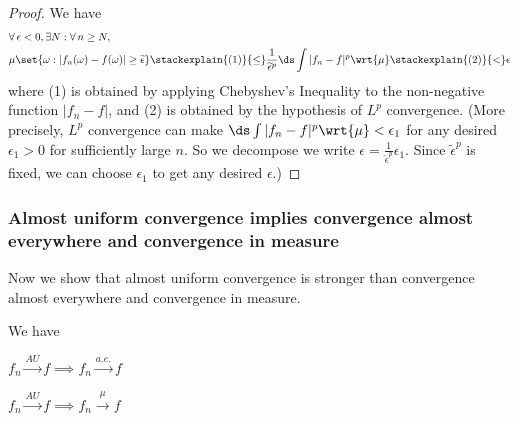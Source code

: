 \documentclass{article} %
\newcommand{\dint}{\ds\int}
\newcommand{\dmu}{\wrt{\mu}}
\newcommand{\epsilontilde}{\widetilde{\epsilon}}
\newcommand{\convergenceAE}{\stackrel{a.e.}{\to}}
\newcommand{\convergenceAU}{\stackrel{AU}{\to}}
\newcommand{\convergenceInMu}{\stackrel{\mu}{\to}}
\begin{document}
\begin{proof}
We have
%
\begin{align*}
& \forall \, \epsilon < 0, \exists N : \forall \, n \geq N, \\
& \mu \set{\omega : |f_n (\omega) - f(\omega)| \geq \epsilontilde}  \stackexplain{(1)}{\leq} \frac{1}{\epsilontilde^p} \dint |f_n -f|^p \dmu \stackexplain{(2)}{<} \epsilon 	
\end{align*}
%
where (1) is obtained by applying Chebyshev's Inequality to the non-negative function $|f_n -f|$, and (2) is obtained by the hypothesis of $L^p$ convergence. {\tiny (More precisely,  $L^p$ convergence can make $\dint |f_n -f|^p \dmu  < \epsilon_1$ for any desired $\epsilon_1 >0$ for sufficiently large $n$.  So we decompose we write $\epsilon = \frac{1}{\epsilontilde^p} \epsilon_1$.  Since $\epsilontilde^p$ is fixed, we can choose $\epsilon_1$ to get any desired $\epsilon.$)} 
\end{proof}


\subsubsection{Almost uniform convergence implies convergence almost everywhere and convergence in measure} 

Now we show that almost uniform convergence is stronger than convergence almost everywhere and convergence in measure.
\begin{theorem}
We have
\begin{alphabate}
\item $f_n \convergenceAU f \implies f_n \convergenceAE f$
\item $f_n \convergenceAU f \implies f_n \convergenceInMu f$		
\end{alphabate}
\label{thm:convergence_AU_implies_convergence_in_measure_and_convergence_AE}
\end{theorem}
\end{document}
